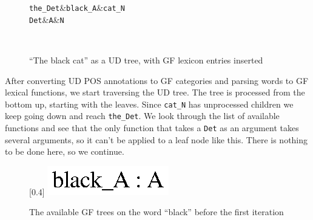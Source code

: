 \begin{figure}[H]
    \centering
    \begin{dependency}
        \begin{deptext}[column sep=0.4cm]
              {\tt the\_Det}\&{\tt black\_A}\&{\tt cat\_N}\\
            {\tt Det}\&{\tt A}\&{\tt N}\\
        \end{deptext}
    \end{dependency} \\
    \caption{``The black cat'' as a UD tree, with GF lexicon entries inserted}
    \label{fig:the_black_cat_ud_gf}
\end{figure}



After converting UD POS annotations to GF categories and parsing words to GF lexical functions, we start traversing the UD tree. The tree is processed from the bottom up, starting with the leaves. Since \lstinline{cat_N} has unprocessed children we keep going down and reach \lstinline{the_Det}. We look through the list of available functions and see that the only function that takes a \lstinline{Det} as an argument takes several arguments, so it can't be applied to a leaf node like this. There is nothing to be done here, so we continue.


\begin{figure}[H]
    \centering
    [0.4\textwidth]
        {\includegraphics[scale=0.75]{thesis/figure/black_cats/black_A_gf.eps}}
    \caption{The available GF trees on the word ``black'' before the first iteration}\label{fig:black iter 0}
\end{figure}

